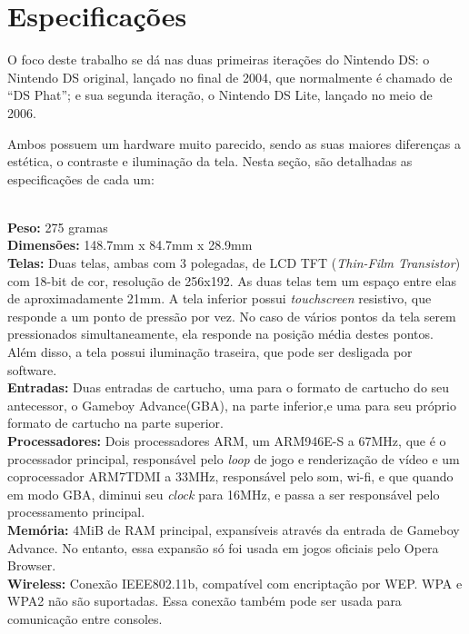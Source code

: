 \documentclass[brazil]{abnt}
\begin{document}
\section{Especificações}

O foco deste trabalho se dá nas duas primeiras iterações do Nintendo DS: o Nintendo DS original, lançado no final de 2004, que normalmente é chamado de ``DS Phat''; e sua segunda iteração, o Nintendo DS Lite, lançado no meio de 2006.

Ambos possuem um hardware muito parecido, sendo as suas maiores diferenças a estética, o contraste e iluminação da tela. Nesta seção, são detalhadas as especificações de cada um:

\\
{\bf Peso:} 275 gramas\\
{\bf Dimensões:} 148.7mm x 84.7mm x 28.9mm\\
{\bf Telas:} Duas telas, ambas com 3 polegadas, de LCD TFT (\textit{Thin-Film Transistor}) com 18-bit de cor, resolução de 256x192. As duas telas tem um espaço entre elas de aproximadamente 21mm. A tela inferior possui \textit{touchscreen} resistivo, que responde a um ponto de pressão por vez. No caso de vários pontos da tela serem pressionados simultaneamente, ela responde na posição média destes pontos.\\
Além disso, a tela possui iluminação traseira, que pode ser desligada por software.\\
{\bf Entradas:} Duas entradas de cartucho, uma para o formato de cartucho do seu antecessor, o Gameboy Advance(GBA), na parte inferior,e uma para seu próprio formato de cartucho na parte superior.\\
{\bf Processadores:} Dois processadores ARM, um ARM946E-S a 67MHz, que é o processador principal, responsável pelo \textit{loop} de jogo e renderização de vídeo e um coprocessador ARM7TDMI a 33MHz, responsável pelo som, wi-fi, e que quando em modo GBA, diminui seu \textit{clock} para 16MHz, e passa a ser responsável pelo processamento principal.\\
{\bf Memória:} 4MiB de RAM principal, expansíveis através da entrada de Gameboy Advance. No entanto, essa expansão só foi usada em jogos oficiais pelo Opera Browser.\\
{\bf Wireless:} Conexão IEEE802.11b, compatível com encriptação por WEP. WPA e WPA2 não são suportadas. Essa conexão também pode ser usada para comunicação entre consoles.\\
\end{document}
